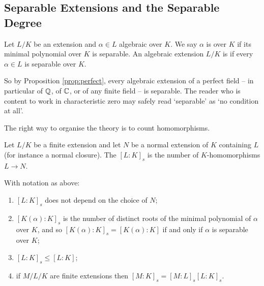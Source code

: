 \documentclass[a4paper]{scrartcl}
\begin{document}
\subsection{Separable Extensions and the Separable Degree}

\begin{definition}
	Let $L/K$ be an extension and $\alpha \in L$ algebraic over $K$. We say $\alpha$ is  over $K$ if its minimal polynomial over $K$ is separable. An algebraic extension $L/K$ is  if every $\alpha \in L$ is separable over $K$.
\end{definition}

So by Proposition \ref{prop:perfect}, every algebraic extension of a perfect field -- in particular of $\mathbb{Q}$, of $\mathbb{C}$, or of any finite field -- is separable. The reader who is content to work in characteristic zero may safely read `separable' as `no condition at all'.

The right way to organise the theory is to count homomorphisms.

\begin{definition}
	Let $L/K$ be a finite extension and let $N$ be a normal extension of $K$ containing $L$ (for instance a normal closure). The  $[L:K]_s$ is the number of $K$-homomorphisms $L \to N$.
\end{definition}

\begin{proposition}\label{prop:sepdeg}
	With notation as above:
	\begin{enumerate}[label=(\roman*)]
		\item $[L:K]_s$ does not depend on the choice of $N$;
		\item $[K(\alpha):K]_s$ is the number of distinct roots of the minimal polynomial of $\alpha$ over $K$, and so $[K(\alpha):K]_s = [K(\alpha):K]$ if and only if $\alpha$ is separable over $K$;
		\item $[L:K]_s \leq [L:K]$;
		\item if $M/L/K$ are finite extensions then $[M:K]_s = [M:L]_s[L:K]_s$.
	\end{enumerate}
\end{proposition}
\end{document}
